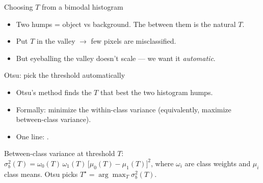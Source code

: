 \documentclass[10pt,aspectratio=169]{beamer}
\begin{document}
\begin{frame}{Choosing $T$ from a bimodal histogram}
  \begin{center}
  \end{center}
  \begin{itemize}
    \item Two humps = object vs background. The  between them is the natural $T$.
    \item Put $T$ in the valley $\rightarrow$ few pixels are misclassified.
    \item But eyeballing the valley doesn't scale — we want it \emph{automatic}.
  \end{itemize}
\end{frame}

\begin{frame}{Otsu: pick the threshold automatically}
  \begin{itemize}
    \item Otsu's method finds the $T$ that best  the two histogram humps.
    \item Formally: minimize the within-class variance (equivalently, maximize between-class variance).
    \item One line: .
  \end{itemize}
  \begin{mathbox}
    Between-class variance at threshold $T$:
    $\sigma_b^2(T) = \omega_0(T)\,\omega_1(T)\,\big[\mu_0(T)-\mu_1(T)\big]^2$,
    where $\omega_i$ are class weights and $\mu_i$ class means. Otsu picks $T^\star=\arg\max_T \sigma_b^2(T)$.
  \end{mathbox}
\end{frame}
\end{document}
